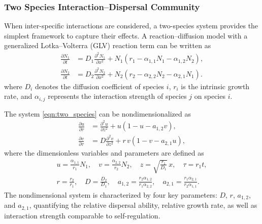     \subsubsection{Two Species Interaction--Dispersal Community}

        When inter-specific interactions are considered, a two-species system provides the simplest framework to capture their effects. A reaction--diffusion model with a generalized Lotka--Volterra (GLV) reaction term can be written as
        \begin{equation}\label{eqn:two_species}
            \begin{aligned}
                \frac{\partial N_1}{\partial t} &= D_{1}\frac{\partial^2 N_1}{\partial x^2} + N_1 \left( r_1 - \alpha_{1,1} N_1 - \alpha_{1,2} N_2 \right),\\ 
                \frac{\partial N_2}{\partial t} &= D_{2}\frac{\partial^2 N_2}{\partial x^2} + N_2 \left( r_2 - \alpha_{2,2} N_2 - \alpha_{2,1} N_1 \right).
            \end{aligned}
        \end{equation}
        where $D_i$ denotes the diffusion coefficient of species $i$, $r_i$ is the intrinsic growth rate, and $\alpha_{i,j}$ represents the interaction strength of species $j$ on species $i$.

        The system \ref{eqn:two_species} can be nondimensionalized as
        \begin{equation}
            \begin{aligned}
                \frac{\partial u}{\partial \tau} 
                &= \frac{\partial^2 u}{\partial z^2} 
                +  u \left( 1 - u - a_{1,2} v \right),\\ 
                \frac{\partial v}{\partial \tau} 
                &= D \frac{\partial^2 v}{\partial z^2} 
                + r\, v \left( 1 - v - a_{2,1} u \right),
            \end{aligned}
        \end{equation}
        where the dimensionless variables and parameters are defined as
        \begin{align*}
            u = \frac{\alpha_{1,1}}{r_1} N_1, \quad
            v = \frac{\alpha_{2,2}}{r_2} N_2, \quad
            z = \sqrt{\frac{r_1}{D_1}}\, x, \quad
            \tau = r_1 t,\\
            r = \frac{r_2}{r_1}, \quad
            D = \frac{D_{2}}{D_{1}}, \quad
            a_{1,2} = \frac{r_2 \alpha_{1,2}}{r_1 \alpha_{2,2}}, \quad
            a_{2,1} = \frac{r_1 \alpha_{2,1}}{r_2 \alpha_{1,1}}.
        \end{align*}
        The nondimensional system is characterized by four key parameters: $D$, $r$, $a_{1,2}$, and $a_{2,1}$, quantifying the relative dispersal ability, relative growth rate, as well as interaction strength comparable to self-regulation.
        
